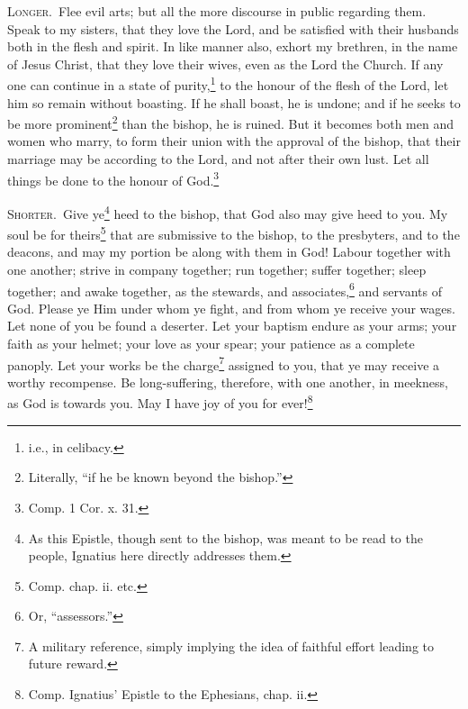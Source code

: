 \textsc{Longer.}~Flee evil arts; but all the more discourse in public regarding them. Speak to my sisters, that they love the Lord, and be satisfied with their husbands both in the flesh and spirit. In like manner also, exhort my brethren, in the name of Jesus Christ, that they love their wives, even as the Lord the Church. If any one can continue in a state of purity,\footnote{i.e., in celibacy.} to the honour of the flesh of the Lord, let him so remain without boasting. If he shall boast, he is undone; and if he seeks to be more prominent\footnote{Literally, “if he be known beyond the bishop.”} than the bishop, he is ruined. But it becomes both men and women who marry, to form their union with the approval of the bishop, that their marriage may be according to the Lord, and not after their own lust. Let all things be done to the honour of God.\footnote{Comp. 1 Cor. x. 31.}


\textsc{Shorter.}~Give ye\footnote{As this Epistle, though sent to the bishop, was meant to be read to the people, Ignatius here directly addresses them.} heed to the bishop, that God also may give heed to you. My soul be for theirs\footnote{Comp. chap. ii. etc.} that are submissive to the bishop, to the presbyters, and to the deacons, and may my portion be along with them in God! Labour together with one another; strive in company together; run together; suffer together; sleep together; and awake together, as the stewards, and associates,\footnote{Or, “assessors.”} and servants of God. Please ye Him under whom ye fight, and from whom ye receive your wages. Let none of you be found a deserter. Let your baptism endure as your arms; your faith as your helmet; your love as your spear; your patience as a complete panoply. Let your works be the charge\footnote{A military reference, simply implying the idea of faithful effort leading to future reward.} assigned to you, that ye may receive a worthy recompense. Be long-suffering, therefore, with one another, in meekness, as God is towards you. May I have joy of you for ever!\footnote{Comp. Ignatius’ Epistle to the Ephesians, chap. ii.}

